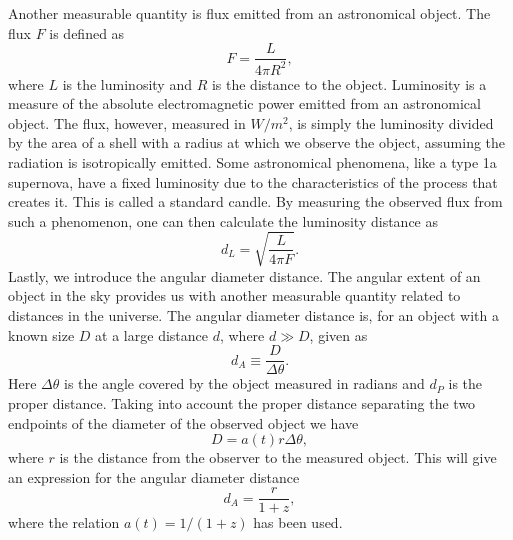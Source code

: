 Another measurable quantity is flux emitted from an astronomical object.
The flux $F$ is defined as
\begin{equation}
    F = \frac{L}{4\pi R^2},
\end{equation}
where $L$ is the luminosity and $R$ is the distance to the object. Luminosity is a measure
of the absolute electromagnetic power emitted from an astronomical object. The flux, however, measured in $W/m^2$, is simply the luminosity
divided by the area of a shell with a radius at which we observe the object, assuming the radiation is isotropically emitted. Some astronomical phenomena, like a type 1a supernova, have a fixed luminosity
due to the characteristics of the process that creates it. This is called a standard candle. By measuring the observed flux from such a phenomenon, one can then
calculate the luminosity distance as 
\begin{equation}
    d_L = \sqrt{\frac{L}{4\pi F}}.
\end{equation}
\indent
Lastly, we introduce the angular diameter distance. The angular extent of an object in the sky provides us with another measurable quantity related to distances in the universe. The angular diameter distance is, for an object with a known size
$D$ at a large distance $d$, where $d\gg D$, given as 
\begin{equation}
    d_A\equiv \frac{D}{\Delta\theta}.
\end{equation}
Here $\Delta\theta$ is the angle covered by the object measured in radians and $d_P$ is the proper distance. Taking into account the proper distance separating the two endpoints of the diameter of the observed object we have 
\begin{equation}
    D=a(t)r\Delta\theta,
\end{equation}
where $r$ is the distance from the observer to the measured object.
This will give an expression for the angular diameter distance
\begin{equation}
    d_A = \frac{r}{1+z},
\end{equation}
where the relation $a(t)=1/(1+z)$ has been used.
